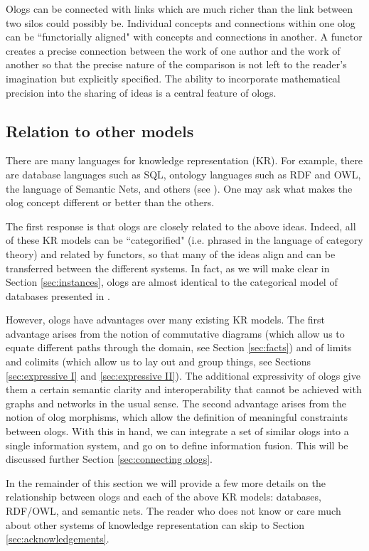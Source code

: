 Ologs can be connected with links which are much richer than the link between two silos could possibly be. Individual concepts and connections within one olog can be ``functorially aligned" with concepts and connections in another. A functor creates a precise connection between the work of one author and the work of another so that the precise nature of the comparison is not left to the reader's imagination but explicitly specified. The ability to incorporate mathematical precision into the sharing of ideas is a central feature of ologs.

\subsection{Relation to other models}

There are many languages for knowledge representation (KR). For example, there are database languages such as SQL, ontology languages such as RDF and OWL, the language of Semantic Nets, and others (see \cite{Bor}). One may ask what makes the olog concept different or better than the others. 

The first response is that ologs are closely related to the above ideas. Indeed, all of these  KR models can be ``categorified" (i.e. phrased in the language of category theory) and related by functors, so that many of the ideas align and can be transferred between the different systems. In fact, as we will make clear in Section \ref{sec:instances}, ologs are almost identical to the categorical model of databases presented in \cite{Spi-FDM}. 

However, ologs have advantages over many existing KR models. The first advantage arises from the notion of commutative diagrams (which allow us to equate different paths through the domain, see Section \ref{sec:facts}) and of limits and colimits (which allow us to lay out and group things, see Sections \ref{sec:expressive I} and \ref{sec:expressive II}). The additional expressivity of ologs give them a certain semantic clarity and interoperability that cannot be achieved with graphs and networks in the usual sense. 
The second advantage arises from the notion of olog morphisms, 
which allow the definition of meaningful constraints between ologs. With this in hand, we can integrate a set of similar ologs into a single information system, and go on to define information fusion. This will be discussed further Section \ref{sec:connecting ologs}.

In the remainder of this section we will provide a few more details on the relationship between ologs and each of the above KR models: databases, RDF/OWL, and semantic nets. The reader who does not know or care much about other systems of knowledge representation can skip to Section \ref{sec:acknowledgements}.

